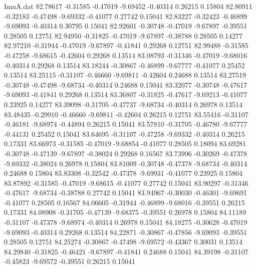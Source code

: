 \begin{filecontents}{ImuA.dat}
  82.78617   -0.31585   -0.47019   -9.69452   -0.40314    0.26215    0.15804
  82.80911   -0.32183   -0.47498   -9.69332   -0.41077    0.27742    0.15041
  82.83227   -0.32423   -0.46899   -9.69093   -0.40314    0.30795    0.15041
  82.92601   -0.30748   -0.47019   -9.67897   -0.39551    0.28505    0.12751
  82.94950   -0.31825   -0.47019   -9.67897   -0.38788    0.28505    0.14277
  82.97210   -0.31944   -0.47019   -9.67897   -0.41841    0.29268    0.12751
  82.99488   -0.31585   -0.47258   -9.68615   -0.42604    0.29268    0.13514
  83.08793   -0.31346   -0.47019   -9.68016   -0.40314    0.29268    0.13514
  83.18244   -0.30867   -0.46899   -9.67777   -0.41077    0.25452    0.13514
  83.25115   -0.31107   -0.46660   -9.69811   -0.42604    0.24688    0.13514
  83.27519   -0.30748   -0.47498   -9.68734   -0.40314    0.24688    0.15041
  83.32077   -0.30748   -0.47617   -9.69093   -0.41841    0.29268    0.13514
  83.36807   -0.31825   -0.47617   -9.69213   -0.41077    0.23925    0.14277
  83.39098   -0.31705   -0.47737   -9.68734   -0.40314    0.26978    0.13514
  83.48435   -0.29910   -0.46660   -9.69811   -0.42604    0.26215    0.12751
  83.55416   -0.31107   -0.46181   -9.68974   -0.44894    0.26215    0.15041
  83.57810   -0.31705   -0.46780   -9.67777   -0.44131    0.25452    0.15041
  83.64695   -0.31107   -0.47258   -9.69332   -0.40314    0.26215    0.17331
  83.66973   -0.31585   -0.47019   -9.68854   -0.41077    0.28505    0.18094
  83.69281   -0.30748   -0.47139   -9.67897   -0.38024    0.29268    0.16567
  83.73996   -0.30269   -0.47378   -9.69332   -0.38024    0.26978    0.15804
  83.81009   -0.30748   -0.47378   -9.68734   -0.40314    0.24688    0.15804
  83.83308   -0.32542   -0.47378   -9.69931   -0.41077    0.23925    0.15804
  83.87892   -0.31585   -0.47019   -9.68615   -0.41077    0.27742    0.15041
  83.90297   -0.31346   -0.47617   -9.68734   -0.38788    0.27742    0.15041
  83.94967   -0.30030   -0.46301   -9.69691   -0.41077    0.28505    0.16567
  84.06605   -0.31944   -0.46899   -9.68016   -0.39551    0.26215    0.17331
  84.08908   -0.31705   -0.47139   -9.68375   -0.39551    0.26978    0.15804
  84.11189   -0.31107   -0.47378   -9.68974   -0.40314    0.26978    0.15041
  84.18275   -0.30628   -0.47019   -9.69093   -0.40314    0.29268    0.13514
  84.22871   -0.30867   -0.47856   -9.69093   -0.39551    0.28505    0.12751
  84.25274   -0.30867   -0.47498   -9.69572   -0.43367    0.30031    0.13514
  84.29840   -0.31825   -0.46421   -9.67897   -0.41841    0.24688    0.15041
  84.39198   -0.31107   -0.45823   -9.69572   -0.39551    0.26215    0.15041

\end{filecontents}
